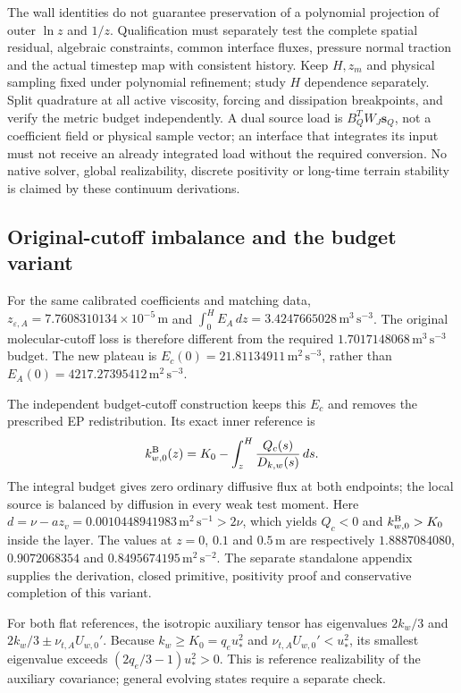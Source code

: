 \documentclass[11pt,a4paper]{article}
\numberwithin{equation}{section}
\begin{document}
The wall identities do not guarantee preservation of a polynomial
projection of outer $\ln z$ and $1/z$. Qualification must separately
test the complete spatial residual, algebraic constraints, common
interface fluxes, pressure normal traction and the actual timestep map
with consistent history. Keep $H,z_m$ and physical sampling fixed under
polynomial refinement; study $H$ dependence separately. Split quadrature
at all active viscosity, forcing and dissipation breakpoints, and verify
the metric budget independently. A dual source load is
$B_Q^TW_J\bm s_Q$, not a coefficient field or physical sample vector;
an interface that integrates its input must not receive an already
integrated load without the required conversion. No native solver,
global realizability, discrete positivity or long-time terrain stability
is claimed by these continuum derivations.

\subsection{Original-cutoff imbalance and the budget variant}
For the same calibrated coefficients and matching data,
$z_{\varepsilon,A}=7.7608310134\times10^{-5}\,\mathrm m$ and
$\int_0^H E_A\,dz=3.4247665028\,\mathrm{m^3\,s^{-3}}$.
The original molecular-cutoff loss is therefore different from the
required $1.7017148068\,\mathrm{m^3\,s^{-3}}$ budget. The new
plateau is $E_c(0)=21.81134911\,\mathrm{m^2\,s^{-3}}$, rather than
$E_A(0)=4217.27395412\,\mathrm{m^2\,s^{-3}}$.

The independent budget-cutoff construction keeps this $E_c$ and removes
the prescribed EP redistribution. Its exact inner reference is
\begin{equation}
 k_{w,0}^{\rm B}(z)=K_0-\int_z^H\frac{Q_c(s)}{D_{k,w}(s)}\,ds.
 \label{eq:budget-reference-comparison}
\end{equation}
The integral budget gives zero ordinary diffusive flux at both endpoints;
the local source is balanced by diffusion in every weak test moment.
Here $d=\nu-az_v=0.0010448941983\,\mathrm{m^2\,s^{-1}}>2\nu$,
which yields $Q_c<0$ and $k_{w,0}^{\rm B}>K_0$ inside the layer.
The values at $z=0$, $0.1$ and $0.5\,\mathrm m$ are respectively
$1.8887084080$, $0.9072068354$ and $0.8495674195\,\mathrm{m^2\,s^{-2}}$.
The separate standalone appendix supplies the derivation, closed
primitive, positivity proof and conservative completion of this variant.

For both flat references, the isotropic auxiliary tensor has eigenvalues
$2k_w/3$ and $2k_w/3\pm\nu_{t,A}U_{w,0}'$. Because
$k_w\geq K_0=q_eu_*^2$ and $\nu_{t,A}U_{w,0}'<u_*^2$,
its smallest eigenvalue exceeds $(2q_e/3-1)u_*^2>0$.
This is reference realizability of the auxiliary covariance; general
evolving states require a separate check.
\end{document}
